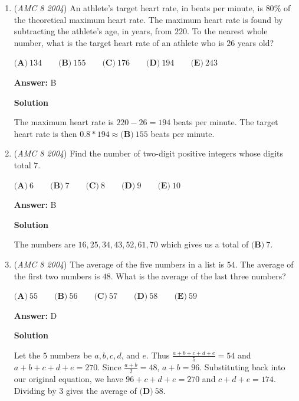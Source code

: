 \begin{enumerate}
\textbf{Solution}

Sally made $0.55*20=11$ shots originally. Letting $x$ be the number of shots she made, we have $\frac{11+x}{25}=0.56$. Solving for $x$ gives us $x=\boxed{\textbf{(C)}\ 3}$



	\item (\textit{AMC 8 2004}) An athlete's target heart rate, in beats per minute, is $80\%$ of the theoretical maximum heart rate. The maximum heart rate is found by subtracting the athlete's age, in years, from $220$. To the nearest whole number, what is the target heart rate of an athlete who is $26$ years old?


 $\textbf{(A)}\ 134\qquad\textbf{(B)}\ 155\qquad\textbf{(C)}\ 176\qquad\textbf{(D)}\ 194\qquad\textbf{(E)}\ 243$

 \textbf{Answer: }B



\textbf{Solution}

The maximum heart rate is $220-26=194$ beats per minute. The target heart rate is then $0.8*194 \approx \boxed{\textbf{(B)}\ 155}$ beats per minute.

 


	\item (\textit{AMC 8 2004}) Find the number of two-digit positive integers whose digits total $7$.


 $\textbf{(A)}\ 6 \qquad\textbf{(B)}\ 7 \qquad\textbf{(C)}\ 8 \qquad\textbf{(D)}\ 9 \qquad\textbf{(E)}\ 10$

 \textbf{Answer: }B



\textbf{Solution}

The numbers are $16, 25, 34, 43, 52, 61, 70$ which gives us a total of $\boxed{\textbf{(B)}\ 7}$.

 


	\item (\textit{AMC 8 2004}) The average of the five numbers in a list is $54$. The average of the first two
numbers is $48$. What is the average of the last three numbers?


 $\textbf{(A)}\ 55\qquad\textbf{(B)}\ 56\qquad\textbf{(C)}\ 57\qquad\textbf{(D)}\ 58\qquad\textbf{(E)}\ 59$

 \textbf{Answer: }D



\textbf{Solution}

Let the $5$ numbers be $a, b, c, d$, and $e$. Thus $\frac{a+b+c+d+e}{5}=54$ and $a+b+c+d+e=270$. Since $\frac{a+b}{2}=48$, $a+b=96$. Substituting back into our original equation, we have $96+c+d+e=270$ and $c+d+e=174$. Dividing by $3$ gives the average of $\boxed{\textbf{(D)}\ 58}$.


\end{enumerate}

